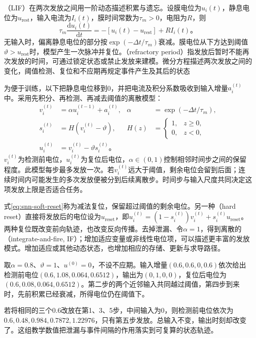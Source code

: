 （LIF）在两次发放之间用一阶动态描述积累与遗忘。设膜电位为$u_i(t)$，静息电位为$u_{\mathrm{rest}}$，输入电流为$I_i(t)$，膜时间常数为$\tau_m>0$，电阻为$R$，则
\begin{equation}
  \tau_m\frac{\mathrm d u_i(t)}{\mathrm d t}
  =-[u_i(t)-u_{\mathrm{rest}}]+RI_i(t)\text{。}
  \label{eq:snn-continuous-lif}
\end{equation}
无输入时，偏离静息电位的部分按$\exp(-\Delta t/\tau_m)$衰减。膜电位从下方达到阈值$\vartheta>u_{\mathrm{rest}}$时，模型产生一次脉冲并复位。（refractory period）指发放后暂时不能再次发放的时间，可通过锁定状态或禁止发放来建模。微分方程描述两次发放之间的变化，阈值检测、复位和不应期再规定事件产生及其后的状态

为便于训练，以下把静息电位移到0，并把电流及积分系数吸收到输入增量$a_i^{(t)}$中。采用先积分、再检测、再减去阈值的离散模型：
\begin{align}
  v_i^{(t)}&=\alpha u_i^{(t-1)}+a_i^{(t)},
  &\alpha&=\exp(-\Delta t/\tau_m),\label{eq:snn-discrete-integrate}\\
  s_i^{(t)}&=H(v_i^{(t)}-\vartheta),
  &H(z)&=\begin{cases}1,&z\geq0,\\0,&z<0,\end{cases}
  \label{eq:snn-discrete-fire}\\
  u_i^{(t)}&=v_i^{(t)}-\vartheta s_i^{(t)}\text{。}
  \label{eq:snn-soft-reset}
\end{align}
$v_i^{(t)}$为检测前电位，$u_i^{(t)}$为复位后电位，$\alpha\in(0,1)$控制相邻时间步之间的保留程度。此模型每步最多发放一次。若$v_i^{(t)}$远大于阈值，剩余电位会留到后面；连续时间内可能发生的多次发放便被分到后续离散步。时间步与输入尺度共同决定这项发放上限是否适合任务。

式\eqref{eq:snn-soft-reset}称为减法复位，保留超过阈值的剩余电位。另一种（hard reset）直接将发放后的电位设为$u_{\mathrm{reset}}$，即$u_i^{(t)}=(1-s_i^{(t)})v_i^{(t)}+s_i^{(t)}u_{\mathrm{reset}}$。两种复位既改变前向轨迹，也改变反向传播。去掉泄漏、令$\alpha=1$，得到离散的（integrate-and-fire, IF）；增加适应变量或非线性电位项，可以描述更丰富的发放模式。增加适应或其他动态状态，也增加相应的存储、更新与求导路径。

\begin{example}[相同输入在不同间隔下的结果]
  \label{ex:snn-integration}
  取$\alpha=0.8$、$\vartheta=1$、$u^{(0)}=0$，不设不应期。输入增量$(0.6,0.6,0,0.6)$依次给出检测前电位$(0.6,1.08,0.064,0.6512)$，输出为$(0,1,0,0)$，复位后电位为$(0.6,0.08,0.064,0.6512)$。第二步的两个近邻输入共同越过阈值，第四步到来时，先前积累已经衰减，所得电位仍在阈值下。

  若将相同的三个$0.6$改放在第1、3、5步，中间输入为0，则检测前电位依次为$0.6,0.48,0.984,0.7872,1.22976$，只有第五步发放。总输入不变，输出时刻却改变了。这组教学数值把泄漏与事件间隔的作用落实到可复算的状态轨迹。
\end{example}

